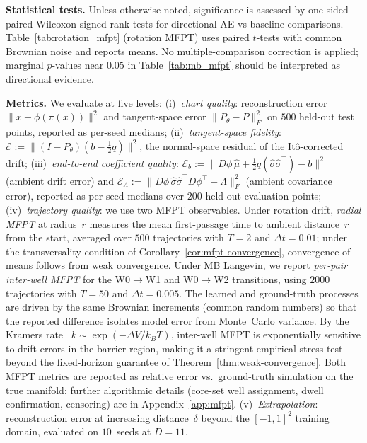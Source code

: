 \documentclass[11pt]{article}
\newcommand{\cE}{\mathcal{E}}
\begin{document}
\noindent \textbf{Statistical tests.}
Unless otherwise noted, significance is assessed by
one-sided paired Wilcoxon signed-rank tests for
directional AE-vs-baseline comparisons.
Table~\ref{tab:rotation_mfpt} (rotation MFPT) uses
paired $t$-tests with common Brownian noise and
reports means.
No multiple-comparison correction is applied; marginal
$p$-values near $0.05$ in Table~\ref{tab:mb_mfpt}
should be interpreted as directional evidence.

\noindent \textbf{Metrics.}
We evaluate at five levels:
(i)~\emph{chart quality}: reconstruction error
$\|x-\phi(\pi(x))\|^2$ and tangent-space error
$\|P_\theta-P\|_F^2$ on $500$ held-out test points,
reported as per-seed medians;
(ii)~\emph{tangent-space fidelity}:
$\cE := \|(I - P_\theta)(b - \tfrac{1}{2}q)\|^2$,
the normal-space residual of the It\^o-corrected drift;
(iii)~\emph{end-to-end coefficient quality}:
$\cE_b := \|D\phi\,\hat\mu + \tfrac{1}{2}q(\hat\sigma\hat\sigma^\top) - b\|^2$
(ambient drift error) and
$\cE_\Lambda := \|D\phi\,\hat\sigma\hat\sigma^\top D\phi^\top - \Lambda\|_F^2$
(ambient covariance error), reported as per-seed
medians over $200$ held-out evaluation points;
(iv)~\emph{trajectory quality}: we use two MFPT
observables.
Under rotation drift, \emph{radial MFPT} at radius~$r$
measures the mean first-passage time to ambient
distance~$r$ from the start, averaged over $500$
trajectories with $T{=}2$ and $\Delta t{=}0.01$;
under the transversality condition of
Corollary~\ref{cor:mfpt-convergence}, convergence of
means follows from weak convergence.
Under MB Langevin, we report \emph{per-pair inter-well
MFPT} for the W0${\to}$W1 and W0${\to}$W2 transitions,
using $2000$ trajectories with $T{=}50$ and
$\Delta t{=}0.005$.
The learned and ground-truth processes are driven by
the same Brownian increments (common random numbers)
so that the reported difference isolates model error
from Monte~Carlo variance.
By the Kramers rate~\cite{Kramers1940,Hanggi1990}
$k\sim\exp(-\Delta V/k_BT)$, inter-well MFPT is
exponentially sensitive to drift errors in the
barrier region, making it a stringent empirical
stress test beyond the fixed-horizon guarantee of
Theorem~\ref{thm:weak-convergence}.
Both MFPT metrics are reported as relative error
vs.\ ground-truth simulation on the true manifold;
further algorithmic details (core-set well assignment,
dwell confirmation, censoring) are in
Appendix~\ref{app:mfpt}.
(v)~\emph{Extrapolation}: reconstruction error at
increasing distance~$\delta$ beyond the $[-1,1]^2$
training domain, evaluated on $10$~seeds at $D{=}11$.
\end{document}
